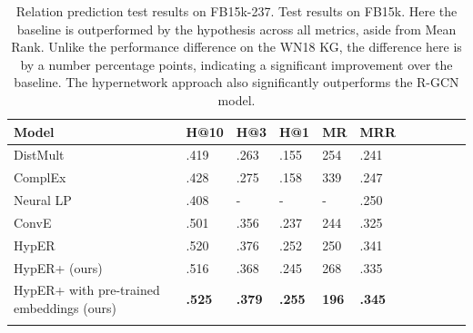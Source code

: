 \begin{table}[H]
		\centering
		\begin{tabular}{lllllllllll}
  			\textbf{Model} & \textbf{H@10} & \textbf{H@3} & \textbf{H@1} & \textbf{MR} & \textbf{MRR} \\
  			\hline
  			DistMult \unskip~\citep{yang2014embedding} & .419 & .263 & .155 & 254 & .241 \\
  			ComplEx \unskip~\citep{trouillon2016complex} & .428 & .275 & .158 & 339 & .247 \\
  			Neural LP  \unskip~\citep{yang2017differentiable} & .408 & - & - & - & .250 \\
			ConvE \unskip~\citep{dettmers2018convolutional} & .501 & .356 & .237 & 244 & .325 \\
			HypER \unskip~\citep{balazevic2019hypernetwork} & .520 & .376 & .252 & 250 & .341 \\
			HypER+ (ours) & .516 & .368 & .245 & 268 & .335 \\
  			\hline
  			HypER+ with pre-trained embeddings (ours) & \textbf{.525} & \textbf{.379} & \textbf{.255} & \textbf{196} & \textbf{.345} \\
			&
		\end{tabular}
		\captionsetup{justification=centering}
		\caption{Relation prediction test results on FB15k-237. Test results on FB15k. Here the baseline is outperformed by the hypothesis across all metrics, aside from Mean Rank. Unlike the performance difference on the WN18 KG, the difference here is by a number percentage points, indicating a significant improvement over the baseline. The hypernetwork approach also significantly outperforms the R-GCN model.}
\end{table}


